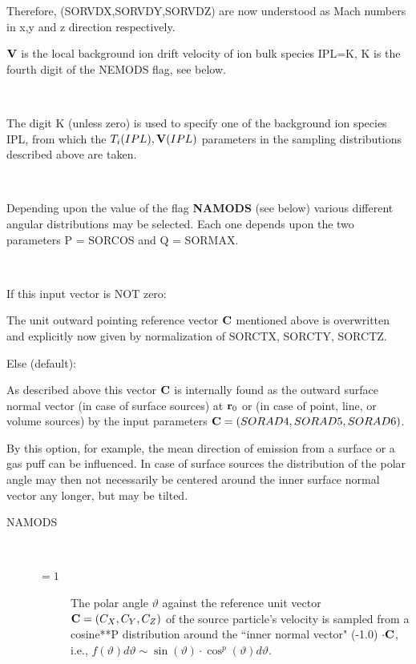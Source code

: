 \begin{description}
\begin{description}
                Therefore, {(SORVDX,SORVDY,SORVDZ)} are now understood as Mach numbers in x,y
                and z direction respectively.
          \item[L = 3] $\mathbf{V}$ is the local background ion drift velocity of ion bulk
                species IPL=K, K is the fourth digit of the NEMODS flag, see below.

          \item[K options] ~ 

                The digit K (unless zero) is used to specify one of the background ion species
                IPL, from which the $T_i(IPL), \mathbf{V}(IPL) $ parameters in the sampling
                distributions described above are taken.

        \end{description}
  \item[SORCOS, SORMAX]~ 

        Depending upon the value of the flag \textbf{NAMODS} (see below) various
        different angular distributions may be selected.
        Each one depends upon the two parameters P = SORCOS and Q = SORMAX.
  \item[SORCTX, SORCTY, SORCTZ]~ 

        If this input vector is NOT zero:

        The unit outward pointing reference vector $\mathbf{C} $ mentioned above is
        overwritten and explicitly now given by normalization of SORCTX, SORCTY,
        SORCTZ.

        Else (default):

        As described above this vector $\mathbf{C}$ is internally found as the outward surface
        normal vector (in case of surface sources) at $\mathbf{r}_0$ or (in case of point,
        line, or volume sources) by the input parameters $\mathbf{C} =(SORAD4,SORAD5,SORAD6)$.

        By this option, for example, the mean direction of emission from a surface or a
        gas puff can be influenced.
        In case of surface sources the distribution of the polar angle may then not
        necessarily be centered around the inner surface normal vector any longer, but
        may be tilted.

        \begin{description}
          \item[NAMODS] ~ 

                \begin{description}
                  \item[$= 1$] The polar angle $\vartheta$ against the
                        reference unit vector $\mathbf{C} = (C_X,C_Y,C_Z)$ of the source particle's velocity
                        is sampled from a cosine**P distribution around the ``inner normal vector"
                        (-1.0) $\cdot \mathbf{C} $, i.e., $f( \vartheta )   d \vartheta   \sim \sin( \vartheta
                          )  \cdot  \cos^p ( \vartheta )	       d \vartheta$.


\end{description}
\end{description}
\end{description}
